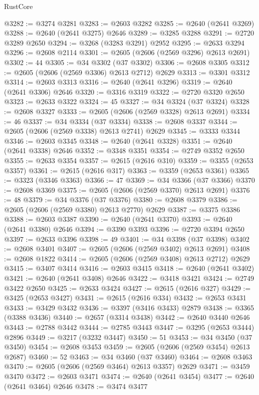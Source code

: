 \begin{lexlean}{RustCore}
\begin{coremodule}
@3282 := @3274 @3281
@3283 := @2603 @3282
@3285 := @2640 (@2641 @3269)
@3288 := @2640 (@2641 @3275) @2646
@3289 := @3285 @3288
@3291 := @2720 @3289 @2650
@3294 := @3268 (@3283 @3291) @2952
@3295 := @2633 @3294
@3296 := @2608 @2114
@3301 := @2605 (@2606 (@2569 @3296) @2613 @2691)
@3302 := 44
@3305 := @34 @3302 (@37 @3302)
@3306 := @2608 @3305
@3312 := @2605 (@2606 (@2569 @3306) @2613 @2712) @2629
@3313 := @3301 @3312
@3314 := @2603 @3313
@3316 := @2640 (@2641 @3296)
@3319 := @2640 (@2641 @3306) @2646
@3320 := @3316 @3319
@3322 := @2720 @3320 @2650
@3323 := @2633 @3322
@3324 := 45
@3327 := @34 @3324 (@37 @3324)
@3328 := @2608 @3327
@3333 := @2605 (@2606 (@2569 @3328) @2613 @2691)
@3334 := 46
@3337 := @34 @3334 (@37 @3334)
@3338 := @2608 @3337
@3344 := @2605 (@2606 (@2569 @3338) @2613 @2741) @2629
@3345 := @3333 @3344
@3346 := @2603 @3345
@3348 := @2640 (@2641 @3328)
@3351 := @2640 (@2641 @3338) @2646
@3352 := @3348 @3351
@3354 := @2749 @3352 @2650
@3355 := @2633 @3354
@3357 := @2615 (@2616 @310)
@3359 := @3355 (@2653 @3357)
@3361 := @2615 (@2616 @317)
@3363 := @3359 (@2653 @3361)
@3365 := @3323 (@3346 @3363)
@3366 := 47
@3369 := @34 @3366 (@37 @3366)
@3370 := @2608 @3369
@3375 := @2605 (@2606 (@2569 @3370) @2613 @2691)
@3376 := 48
@3379 := @34 @3376 (@37 @3376)
@3380 := @2608 @3379
@3386 := @2605 (@2606 (@2569 @3380) @2613 @2770) @2629
@3387 := @3375 @3386
@3388 := @2603 @3387
@3390 := @2640 (@2641 @3370)
@3393 := @2640 (@2641 @3380) @2646
@3394 := @3390 @3393
@3396 := @2720 @3394 @2650
@3397 := @2633 @3396
@3398 := 49
@3401 := @34 @3398 (@37 @3398)
@3402 := @2608 @3401
@3407 := @2605 (@2606 (@2569 @3402) @2613 @2691)
@3408 := @2608 @1822
@3414 := @2605 (@2606 (@2569 @3408) @2613 @2712) @2629
@3415 := @3407 @3414
@3416 := @2603 @3415
@3418 := @2640 (@2641 @3402)
@3421 := @2640 (@2641 @3408) @2646
@3422 := @3418 @3421
@3424 := @2749 @3422 @2650
@3425 := @2633 @3424
@3427 := @2615 (@2616 @327)
@3429 := @3425 (@2653 @3427)
@3431 := @2615 (@2616 @334)
@3432 := @2653 @3431
@3433 := @3429 @3432
@3436 := @3397 (@3416 @3433) @2879
@3438 := @3365 (@3388 @3436)
@3440 := @2657 (@3314 @3438)
@3442 := @2640 @3440 @2646
@3443 := @2788 @3442
@3444 := @2785 @3443
@3447 := @3295 (@2653 @3444) @2896
@3449 := @3217 (@3232 @3447)
@3450 := 51
@3453 := @34 @3450 (@37 @3450)
@3454 := @2608 @3453
@3459 := @2605 (@2606 (@2569 @3454) @2613 @2687)
@3460 := 52
@3463 := @34 @3460 (@37 @3460)
@3464 := @2608 @3463
@3470 := @2605 (@2606 (@2569 @3464) @2613 @3357) @2629
@3471 := @3459 @3470
@3472 := @2603 @3471
@3474 := @2640 (@2641 @3454)
@3477 := @2640 (@2641 @3464) @2646
@3478 := @3474 @3477

\end{coremodule}
\end{lexlean}
